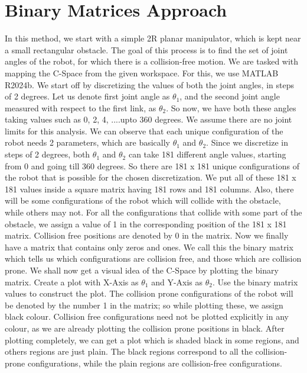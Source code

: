 \documentclass[12pt]{article}
\begin{document}
\section{Binary Matrices Approach}
In this method, we start with a simple 2R planar manipulator, which is kept near a small rectangular obstacle. The goal of this process is to find the set of joint angles of the robot, for which there is a collision-free motion. We are tasked with mapping the C-Space from the given workspace. For this, we use MATLAB R2024b. We start off by discretizing the values of both the joint angles, in steps of 2 degrees. Let us denote first joint angle as $\theta_1$, and the second joint angle measured with respect to the first link, as $\theta_2$. So now, we have both these angles taking values such as 0, 2, 4, ....upto 360 degrees. We assume there are no joint limits for this analysis.
\newline
We can observe that each unique configuration of the robot needs 2 parameters, which are basically $\theta_1$ and $\theta_2$. Since we discretize in steps of 2 degrees, both $\theta_1$ and $\theta_2$ can take 181 different angle values, starting from 0 and going till 360 degrees. So there are 181 x 181 unique configurations of the robot that is possible for the chosen discretization. We put all of these 181 x 181 values inside a square matrix having 181 rows and 181 columns. Also, there will be some configurations of the robot which will collide with the obstacle, while others may not. For all the configurations that collide with some part of the obstacle, we assign a value of 1 in the corresponding position of the 181 x 181 matrix. Collision free positions are denoted by 0 in the matrix. Now we finally have a matrix that contains only zeros and ones. We call this the binary matrix which tells us which configurations are collision free, and those which are collision prone.
\newline
We shall now get a visual idea of the C-Space by plotting the binary matrix. Create a plot with X-Axis as $\theta_1$ and Y-Axis as $\theta_2$. Use the binary matrix values to construct the plot. The collision prone configurations of the robot will be denoted by the number 1 in the matrix; so while plotting these, we assign black colour. Collision free configurations need not be plotted explicitly in any colour, as we are already plotting the collision prone positions in black. After plotting completely, we can get a plot which is shaded black in some regions, and others regions are just plain. The black regions correspond to all the collision-prone configurations, while the plain regions are collision-free configurations.
\end{document}
